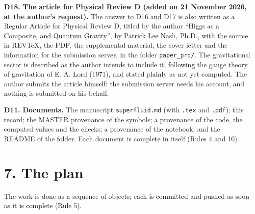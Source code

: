 \documentclass[
  10pt,
]{article}
\begin{document}
\textbf{D18. The article for Physical Review D (added on 21 November
2026, at the author's request).} The answer to D16 and D17 is also
written as a Regular Article for Physical Review D, titled by the author
``Higgs as a Composite, and Quantum Gravity'', by Patrick Lee Nash,
Ph.D., with the source in REVTeX, the PDF, the supplemental material,
the cover letter and the information for the submission server, in the
folder \texttt{paper\_prd/}. The gravitational sector is described as
the author intends to include it, following the gauge theory of
gravitation of E. A. Lord (1971), and stated plainly as not yet
computed. The author submits the article himself: the submission server
needs his account, and nothing is submitted on his behalf.

\textbf{D11. Documents.} The manuscript \texttt{superfluid.md} (with
\texttt{.tex} and \texttt{.pdf}); this record; the MASTER provenance of
the symbols; a provenance of the code, the computed values and the
checks; a provenance of the notebook; and the README of the folder. Each
document is complete in itself (Rules 4 and 10).

\hypertarget{the-plan}{%
\section{7. The plan}\label{the-plan}}

The work is done as a sequence of objects; each is committed and pushed
as soon as it is complete (Rule 5).
\end{document}
